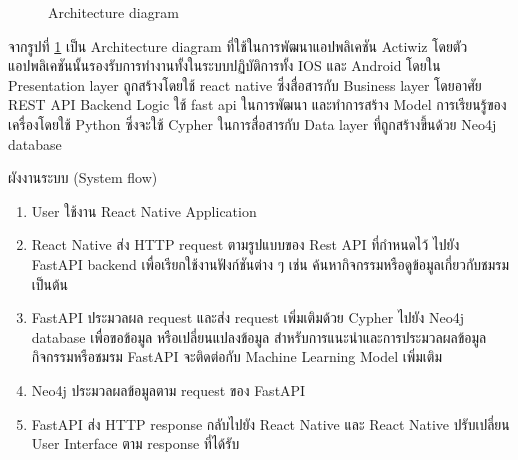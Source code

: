 \documentclass[14pt,oneside,openright,a4paper]{cpe-thai-project}
\begin{document}
  \begin{figure}[!h]\centering
    \setlength{\fboxrule}{0.5mm} %
    \setlength{\fboxsep}{0.5cm}
    \caption{Architecture diagram}\label{fig:ArchDia}
    \end{figure}

  จากรูปที่ \ref{fig:ArchDia} เป็น Architecture diagram ที่ใช้ในการพัฒนาแอปพลิเคชัน Actiwiz โดยตัวแอปพลิเคชันนั้นรองรับการทำงานทั้งในระบบปฏิบัติการทั้ง IOS และ Android โดยใน Presentation layer ถูกสร้างโดยใช้ react native ซึ่งสื่อสารกับ Business layer โดยอาศัย REST API Backend Logic ใช้ fast api ในการพัฒนา และทำการสร้าง Model การเรียนรู้ของเครื่องโดยใช้ Python ซึ่งจะใช้ Cypher ในการสื่อสารกับ Data layer ที่ถูกสร้างขึ้นด้วย Neo4j database
\newpage

ผังงานระบบ (System flow)
\begin{enumerate}
  \item User ใช้งาน React Native Application
  \item React Native ส่ง HTTP request ตามรูปแบบของ Rest API ที่กำหนดไว้ ไปยัง FastAPI backend เพื่อเรียกใช้งานฟังก์ชันต่าง ๆ เช่น ค้นหากิจกรรมหรือดูข้อมูลเกี่ยวกับชมรม เป็นต้น
  \item FastAPI ประมวลผล request และส่ง request เพิ่มเติมด้วย Cypher ไปยัง Neo4j database เพื่อขอข้อมูล หรือเปลี่ยนแปลงข้อมูล
    สำหรับการแนะนำและการประมวลผลข้อมูลกิจกรรมหรือชมรม FastAPI จะติดต่อกับ Machine Learning Model เพิ่มเติม
  \item Neo4j ประมวลผลข้อมูลตาม request ของ FastAPI
  \item FastAPI ส่ง HTTP response กลับไปยัง React Native และ React Native ปรับเปลี่ยน User Interface ตาม response ที่ได้รับ
\end{enumerate}
\end{document}
